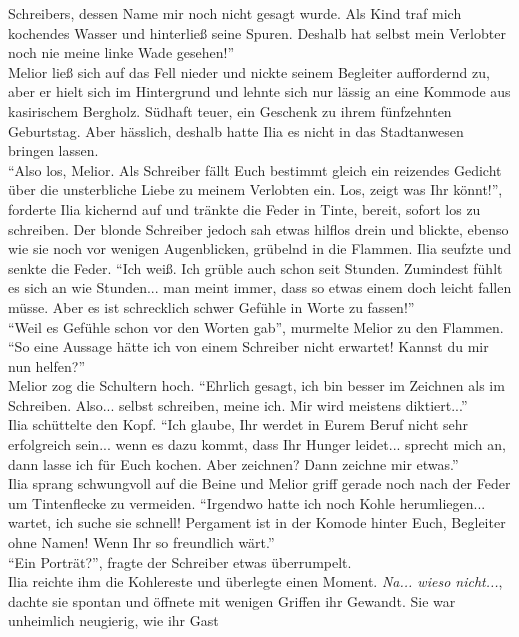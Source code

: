 Schreibers, dessen Name mir noch nicht gesagt wurde. Als Kind traf mich kochendes Wasser und 
hinterließ seine Spuren. Deshalb hat selbst mein Verlobter noch nie meine linke Wade gesehen!''\\
Melior ließ sich auf das Fell nieder und nickte seinem Begleiter auffordernd zu, aber er hielt sich 
im Hintergrund und lehnte sich nur lässig an eine Kommode aus kasirischem Bergholz. Südhaft teuer, 
ein Geschenk zu ihrem fünfzehnten Geburtstag. Aber hässlich, deshalb hatte Ilia es nicht in das 
Stadtanwesen bringen lassen.\\
``Also los, Melior. Als Schreiber fällt Euch bestimmt gleich ein reizendes Gedicht über die 
unsterbliche Liebe zu meinem Verlobten ein. Los, zeigt was Ihr könnt!'', forderte Ilia kichernd auf 
und tränkte die Feder in Tinte, bereit, sofort los zu schreiben. Der blonde Schreiber jedoch sah 
etwas hilflos drein und blickte, ebenso wie sie noch vor wenigen Augenblicken, grübelnd in die 
Flammen. Ilia seufzte und senkte die Feder. ``Ich weiß. Ich grüble auch schon seit Stunden. 
Zumindest fühlt es sich an wie Stunden... man meint immer, dass so etwas einem doch leicht fallen 
müsse. Aber es ist schrecklich schwer Gefühle in Worte zu fassen!'' \\
``Weil es Gefühle schon vor den Worten gab'', murmelte Melior zu den Flammen.\\
``So eine Aussage hätte ich von einem Schreiber nicht erwartet! Kannst du mir nun helfen?''\\
Melior zog die Schultern hoch. ``Ehrlich gesagt, ich bin besser im Zeichnen als im Schreiben. 
Also... selbst schreiben, meine ich. Mir wird meistens diktiert...''\\
Ilia schüttelte den Kopf. ``Ich glaube, Ihr werdet in Eurem Beruf nicht sehr erfolgreich sein... 
wenn es dazu kommt, dass Ihr Hunger leidet... sprecht mich an, dann lasse ich für Euch kochen. Aber 
zeichnen? Dann zeichne mir etwas.''\\
Ilia sprang schwungvoll auf die Beine und Melior griff gerade noch nach der Feder um Tintenflecke 
zu vermeiden. ``Irgendwo hatte ich noch Kohle herumliegen... wartet, ich suche sie schnell! 
Pergament ist in der Komode hinter Euch, Begleiter ohne Namen! Wenn Ihr so freundlich wärt.''\\
``Ein Porträt?'', fragte der Schreiber etwas überrumpelt.\\
Ilia reichte ihm die Kohlereste und überlegte einen Moment. \textit{Na... wieso nicht...}, dachte 
sie spontan und öffnete mit wenigen Griffen ihr Gewandt. Sie war unheimlich neugierig, wie ihr Gast 
